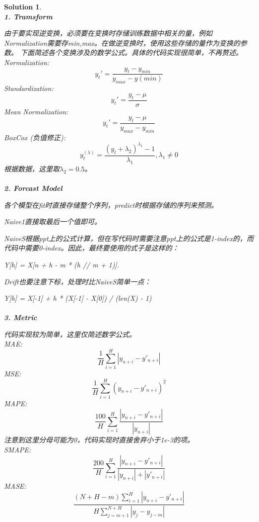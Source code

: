 \documentclass[a4paper,UTF8]{article}
\numberwithin{equation}{section}
\newtheorem*{mySol}{Solution}
\begin{document}
\begin{mySol}
~\\
\textbf{1. Tramsform}

由于要实现逆变换，必须要在变换时存储训练数据中相关的量，例如Normalization需要存min,max。在做逆变换时，使用这些存储的量作为变换的参数。
下面简述各个变换涉及的数学公式。具体的代码实现很简单，不再赘述。 \\
Normalization:
$$
y_t'=\frac{y_t-y_{min}}{y_{max}-y(min)}
$$
Standardization:
$$
y_t'=\frac{y_t-\mu}{\sigma}
$$
Mean Normalization:
$$
y_t'=\frac{y_t-\mu}{y_{max}-y_{min}}
$$
BoxCox (负值修正):
$$
y_t^{(\lambda)}=\frac{(y_t+\lambda_2)^{\lambda_1}-1}{\lambda_1}, \lambda_1 \neq 0
$$
根据数据，这里取$\lambda_2=0.5$。
\\
\\
\textbf{2. Forcast Model}

各个模型在fit时直接存储整个序列，predict时根据存储的序列来预测。

Naive1直接取最后一个值即可。

NaiveS根据ppt上的公式计算，但在写代码时需要注意ppt上的公式是1-index的，而代码中需要0-index。因此，最终要使用的式子是这样的：

Y[h] = X[n + h - m * (h // m + 1)].

Drift也要注意下标，处理时比NaiveS简单一点：

Y[h] = X[-1] + h * (X[-1] - X[0]) / (len(X) - 1)
\\
\\
\textbf{3. Metric}

代码实现较为简单，这里仅简述数学公式。
\\
MAE:
$$
\frac{1}{H}\sum_{i=1}^{H}|y_{n+i}-y'_{n+i}|
$$
MSE:
$$
\frac{1}{H}\sum_{i=1}^{H}(y_{n+i}-y'_{n+i})^2
$$
MAPE:
$$
\frac{100}{H}\sum_{i=1}^{H}\frac{|y_{n+i}-y'_{n+i}|}{|y_{n+i}|}
$$
注意到这里分母可能为0，代码实现时直接舍弃小于1e-3的项。
\\
SMAPE:
$$
\frac{200}{H}\sum_{i=1}^{H}\frac{|y_{n+i}-y'_{n+i}|}{|y_{n+i}|+|y'_{n+i}|}
$$
MASE:
$$
\frac{(N+H-m)\sum_{i=1}^{H}|y_{n+i}-y'_{n+i}|}{H\sum_{j=m+1}^{N+H}|y_j-y_{j-m}|}
$$


\end{mySol}
\end{document}
